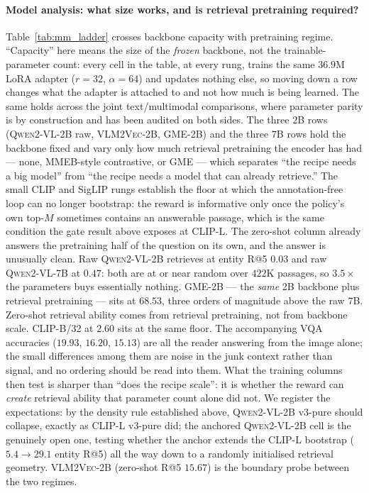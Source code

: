 \paragraph{Model analysis: what size works, and is retrieval pretraining required?} Table~\ref{tab:mm_ladder}
crosses backbone capacity with pretraining regime. ``Capacity'' here means the size of the
\emph{frozen} backbone, not the trainable-parameter count: every cell in the table, at every
rung, trains the same $36.9$M LoRA adapter ($r{=}32$, $\alpha{=}64$) and updates nothing else,
so moving down a row changes what the adapter is attached to and not how much is being learned.
The same holds across the joint text/multimodal comparisons, where parameter parity is by
construction and has been audited on both sides. The three $2$B rows
(\textsc{Qwen2-VL-2B} raw, \textsc{VLM2Vec-2B}, \textsc{GME-2B}) and the three $7$B rows hold the
backbone fixed and vary only how much retrieval pretraining the encoder has had --- none,
MMEB-style contrastive, or GME --- which separates ``the recipe needs a big model'' from ``the
recipe needs a model that can already retrieve.'' The small CLIP and SigLIP rungs establish the
floor at which the annotation-free loop can no longer bootstrap: the reward is informative only
once the policy's own top-$M$ sometimes contains an answerable passage, which is the same
condition the gate result above exposes at CLIP-L. The zero-shot column already answers the
pretraining half of the question on its own, and the answer is unusually clean. Raw
\textsc{Qwen2-VL-2B} retrieves at entity R@5 $0.03$ and raw \textsc{Qwen2-VL-7B} at $0.47$: both
are at or near random over $422$K passages, so $3.5\times$ the parameters buys essentially
nothing. \textsc{GME-2B} --- the \emph{same} 2B backbone plus retrieval pretraining --- sits at
$68.53$, three orders of magnitude above the raw 7B. Zero-shot retrieval ability comes from
retrieval pretraining, not from backbone scale. \textsc{CLIP-B/32} at $2.60$ sits at the same
floor. The accompanying VQA accuracies ($19.93$, $16.20$, $15.13$) are all the reader answering
from the image alone; the small differences among them are noise in the junk context rather than
signal, and no ordering should be read into them. What the training columns then test is
sharper than ``does the recipe scale'': it is whether the reward can \emph{create} retrieval
ability that parameter count alone did not. We register the expectations: by the density rule established
above, \textsc{Qwen2-VL-2B} v3-pure should collapse, exactly as \textsc{CLIP-L} v3-pure did;
the anchored \textsc{Qwen2-VL-2B} cell is the genuinely open one, testing whether the anchor
extends the \textsc{CLIP-L} bootstrap ($5.4 \to 29.1$ entity R@5) all the way down to a randomly
initialised retrieval geometry. \textsc{VLM2Vec-2B} (zero-shot R@5 $15.67$) is the boundary probe
between the two regimes.

